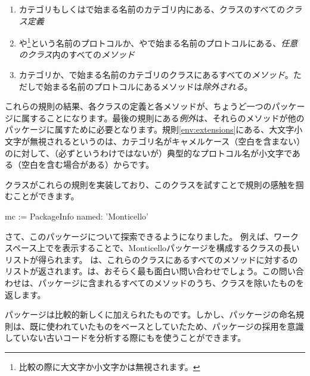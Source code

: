 \documentclass[a4paper,10pt,twoside]{book}
\begin{document}
\begin{enumerate} 
\item{} カテゴリもしくはで始まる名前のカテゴリ内にある、クラスのすべての\emph{クラス定義}
\item{} \label{env:extensions} や\footnote{比較の際に大文字か小文字かは無視されます。}という名前のプロトコルか、やで始まる名前のプロトコルにある、\emph{任意のクラス}内のすべての\emph{メソッド}
\item{} カテゴリか、で始まる名前のカテゴリのクラスにあるすべての\emph{メソッド}。ただし\prot{*}で始まる名前のプロトコルにあるメソッドは\emph{除外される}。

\end{enumerate}
\noindent
これらの規則の結果、各クラスの定義と各メソッドが、ちょうど一つのパッケージに属することになります。最後の規則にある\emph{例外}は、それらのメソッドが他のパッケージに属すために必要となります。規則\ref{env:extensions}にある、大文字小文字が無視されるというのは、カテゴリ名がキャメルケース（空白を含まない）のに対して、（必ずというわけではないが）典型的なプロトコル名が小文字である（空白を含む場合がある）からです。

クラスがこれらの規則を実装しており、このクラスを試すことで規則の感触を掴むことができます。


\begin{code}{}
mc := PackageInfo named: 'Monticello'
\end{code}

さて、このパッケージについて探索できるようになりました。
例えば、ワークスペース上でを表示することで、Monticelloパッケージを構成するクラスの長いリストが得られます。
は、これらのクラスにあるすべてのメソッドに対するのリストが返されます。は、おそらく最も面白い問い合わせでしょう。この問い合わせは、パッケージに含まれるすべてのメソッドのうち、クラスを除いたものを返します。

パッケージは比較的新しく\pharo に加えられたものです。しかし、パッケージの命名規則は、既に使われていたものをベースとしていたため、パッケージの採用を意識していない古いコードを分析する際にもを使うことができます。

\end{document}

